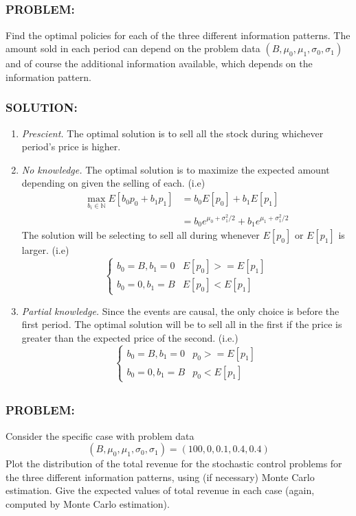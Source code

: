 \documentclass[]{article}
\newcommand{\Problem}{\subsubsection*{\textbf{PROBLEM:}}}
\newcommand{\Solution}{\subsubsection*{\textbf{SOLUTION:}}}
\newcommand{\N}{\mathbb{N}}
\begin{document}
\subsection{}
\Problem
Find the optimal policies for each of the three different information patterns.
The amount sold in each period can depend on the problem data $(B,\mu_0,\mu_1,\sigma_0,\sigma_1)$ and of course the additional information available, which depends on the information pattern.

\Solution

\begin{enumerate}
    \item \emph{Prescient.}
    The optimal solution is to sell all the stock during whichever period's price is higher.
    \item \emph{No knowledge.}
    The optimal solution is to maximize the expected amount depending on given the selling of each.
    (i.e)\begin{align*}
        \max_{b_i\in \N} E[b_0 p_0 + b_1 p_1] 
            &= b_0 E[p_0] + b_1 E[p_1] \\
            &= b_0 e^{\mu_0+\sigma_1^2/2} + b_1 e^{\mu_1+\sigma_1^2/2}
    \end{align*}
    The solution will be selecting to sell all during whenever $E[p_0]$ or $E[p_1]$ is larger.
    (i.e)\[
        \begin{cases}
            b_0 = B, b_1 = 0 &E[p_0] >= E[p_1]\\
            b_0 = 0, b_1 = B &E[p_0] < E[p_1]
        \end{cases}    
    \]
    \item \emph{Partial knowledge.}
    Since the events are causal, the only choice is before the first period.
    The optimal solution will be to sell all in the first if the price is greater than the expected price of the second. 
    (i.e.) \[
        \begin{cases}
            b_0 = B, b_1 = 0 &p_0 >= E[p_1]\\
            b_0 = 0, b_1 = B &p_0 < E[p_1]
        \end{cases}    
    \]
\end{enumerate}

\newpage
\subsection{}
\Problem
Consider the specific case with problem data \[
    (B,\mu_0,\mu_1,\sigma_0,\sigma_1) = (100,0,0.1,0.4,0.4)
\]
Plot the distribution of the total revenue for the stochastic control problems for the three different information patterns, using (if necessary) Monte Carlo estimation. 
Give the expected values of total revenue in each case (again, computed by Monte Carlo estimation).
\end{document}

